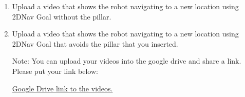 \documentclass[12pt]{article}
\begin{document}
\begin{enumerate}
\begin{enumerate}
        \item Upload a video that shows the robot navigating to a new location using 2DNav Goal without the pillar.
        \item Upload a video that shows the robot navigating to a new location using 2DNav Goal that avoids the pillar that you inserted.
        
        Note: You can upload your videos into the google drive and share a link. Please put your link below:
        
        \href{https://drive.google.com/drive/folders/1zuAvhevD33JzZjYobt6tLiEW6jaDhEhm?usp=sharing}{Google Drive link to the videos.}

    \end{enumerate}

\end{enumerate}
\end{document}
